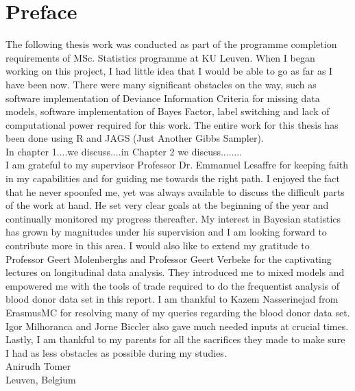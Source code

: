 
\chapter{Preface}
\label{ch : preface}

The following thesis work was conducted as part of the programme completion requirements of MSc. Statistics programme at KU Leuven. When I began working on this project, I had little idea that I would be able to go as far as I have been now. There were many significant obstacles on the way, such as software implementation of Deviance Information Criteria for missing data models, software implementation of Bayes Factor, label switching and lack of computational power required for this work. The entire work for this thesis has been done using R and JAGS (Just Another Gibbs Sampler).\\

In chapter 1....we discuss....in Chapter 2 we discuss........\\

I am grateful to my supervisor Professor Dr. Emmanuel Lesaffre for keeping faith in my capabilities and for guiding me towards the right path. I enjoyed the fact that he never spoonfed me, yet was always available to discuss the difficult parts of the work at hand. He set very clear goals at the beginning of the year and continually monitored my progress thereafter. My interest in Bayesian statistics has grown by magnitudes under his supervision and I am looking forward to contribute more in this area. I would also like to extend my gratitude to Professor Geert Molenberghs and Professor Geert Verbeke for the captivating lectures on longitudinal data analysis. They introduced me to mixed models and empowered me with the tools of trade required to do the frequentist analysis of blood donor data set in this report. I am thankful to Kazem Nasserinejad from ErasmusMC for resolving many of my queries regarding the blood donor data set. Igor Milhoranca and Jorne Biccler also gave much needed inputs at crucial times. Lastly, I am thankful to my parents for all the sacrifices they made to make sure I had as less obstacles as possible during my studies.\\

Anirudh Tomer\\
Leuven, Belgium